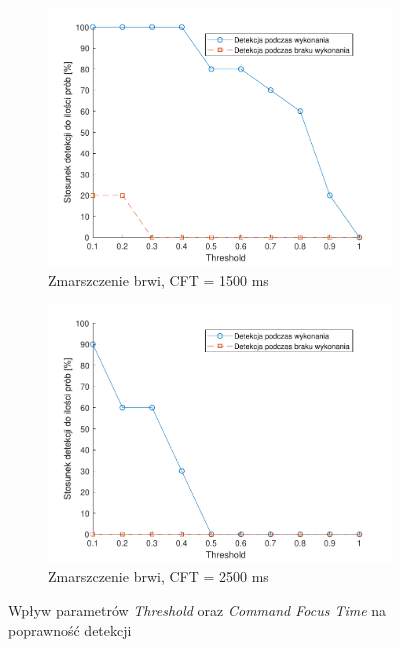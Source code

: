 \documentclass[skorowidz,skroty]{dyplomWEZUT}
\begin{document}
\begin{figure}
    \medskip
    \begin{subfigure}{0.49\textwidth}
    \includegraphics[width=\linewidth]{graphic/frown1500}
    \caption{Zmarszczenie brwi, CFT = 1500 ms\label{fig:frown1500}}
    \end{subfigure}\hspace*{\fill}
    \begin{subfigure}{0.49\textwidth}
    \includegraphics[width=\linewidth]{graphic/frown2500}
    \caption{Zmarszczenie brwi, CFT = 2500 ms\label{fig:frown2500}}
    \end{subfigure}
    
    \caption{Wpływ parametrów \textit{Threshold} oraz \textit{Command Focus Time} na poprawność detekcji\label{fig:parameter}}
\end{figure}
\end{document}
